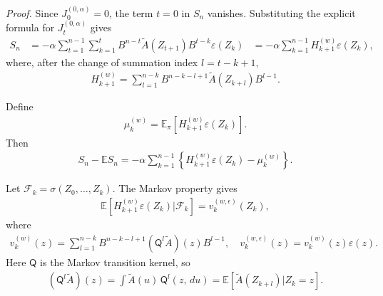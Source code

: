 \textit{Proof.} Since \(J_0^{(0, \alpha)} = 0\), the term \(t = 0\) in \(S_n\) vanishes.
Substituting the explicit formula for \(J_t^{(0, \alpha)}\) gives
\begin{equation}
\begin{aligned}
S_n
&= - \alpha \sum_{t=1}^{n-1} \sum_{k=1}^t
    B^{n-t} \widetilde{A}(Z_{t+1}) B^{t-k} \varepsilon(Z_k)
&= - \alpha \sum_{k=1}^{n-1}
    H_{k+1}^{(w)} \varepsilon(Z_k),
\end{aligned}
\end{equation}
where, after the change of summation index \(l = t - k + 1\),
\begin{equation}
\begin{aligned}
H_{k+1}^{(w)}
  = \sum_{l=1}^{n-k}
      B^{n-k-l+1} \widetilde{A}(Z_{k+l}) B^{l-1}.
\end{aligned}
\end{equation}

Define
\begin{equation}
\begin{aligned}
\mu_k^{(w)} = \mathbb{E}_\pi \left[H_{k+1}^{(w)} \varepsilon(Z_k)\right].
\end{aligned}
\end{equation}
Then
\begin{equation}
\begin{aligned}
S_n - \mathbb{E}S_n
  = - \alpha \sum_{k=1}^{n-1}
      \left\{H_{k+1}^{(w)} \varepsilon(Z_k) - \mu_k^{(w)}\right\}.
\end{aligned}
\end{equation}

Let \(\mathcal{F}_k = \sigma(Z_0, \dots, Z_k)\). The Markov property gives
\begin{equation}
\begin{aligned}
\mathbb{E}[H_{k+1}^{(w)} \varepsilon(Z_k) | \mathcal{F}_k]
  = v_k^{(w, \epsilon)}(Z_k),
\end{aligned}
\end{equation}
where
\begin{equation}
\begin{aligned}
v_k^{(w)}(z)
  = \sum_{l=1}^{n-k}
      B^{n-k-l+1} (\mathsf{Q}^l \widetilde{A})(z) B^{l-1},
\quad
v_k^{(w, \epsilon)}(z)
  = v_k^{(w)}(z) \varepsilon(z).
\end{aligned}
\end{equation}
Here \(\mathsf{Q}\) is the Markov transition kernel, so
\begin{equation}
\begin{aligned}
(\mathsf{Q}^l \widetilde{A})(z)
  = \int \widetilde{A}(u) \, \mathsf{Q}^l (z, \, d u)
  = \mathbb{E} \left[\widetilde{A}(Z_{k+l}) | Z_k = z\right].
\end{aligned}
\end{equation}

